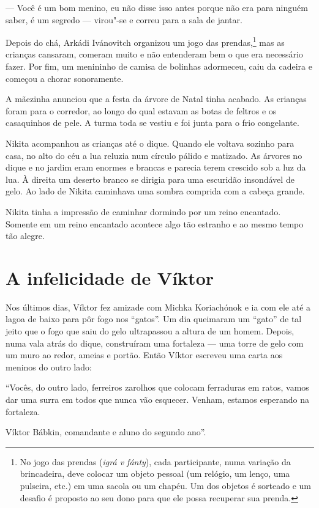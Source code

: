 --- Você é um bom menino, eu não disse isso antes porque não era para
ninguém saber, é um segredo --- virou"-se e correu para a sala de jantar.

Depois do chá, Arkádi Ivánovitch organizou um jogo das
prendas,\footnote{No jogo das prendas (\emph{igrá v fánty}), cada
  participante, numa variação da brincadeira, deve colocar um objeto
  pessoal (um relógio, um lenço, uma pulseira, etc.) em uma sacola ou um
  chapéu. Um dos objetos é sorteado e um desafio é proposto ao seu dono
  para que ele possa recuperar sua prenda.} mas as crianças cansaram,
comeram muito e não entenderam bem o que era necessário fazer. Por fim,
um menininho de camisa de bolinhas adormeceu, caiu da cadeira e começou
a chorar sonoramente.

A mãezinha anunciou que a festa da árvore de Natal tinha acabado. As
crianças foram para o corredor, ao longo do qual estavam as botas de
feltros e os casaquinhos de pele. A turma toda se vestiu e foi junta
para o frio congelante.

Nikita acompanhou as crianças até o dique. Quando ele voltava sozinho
para casa, no alto do céu a lua reluzia num círculo pálido e matizado.
As árvores no dique e no jardim eram enormes e brancas e parecia terem
crescido sob a luz da lua. À direita um deserto branco se dirigia para
uma escuridão insondável de gelo. Ao lado de Nikita caminhava uma sombra
comprida com a cabeça grande.

Nikita tinha a impressão de caminhar dormindo por um reino encantado.
Somente em um reino encantado acontece algo tão estranho e ao mesmo
tempo tão alegre.

\chapter{A infelicidade de Víktor}

Nos últimos dias, Víktor fez amizade com Michka Koriachónok e ia com ele
até a lagoa de baixo para pôr fogo nos ``gatos''. Um dia queimaram um
``gato'' de tal jeito que o fogo que saiu do gelo ultrapassou a altura
de um homem. Depois, numa vala atrás do dique, construíram uma fortaleza
--- uma torre de gelo com um muro ao redor, ameias e portão. Então
Víktor escreveu uma carta aos meninos do outro lado:

``Vocês, do outro lado, ferreiros zarolhos que colocam ferraduras em
ratos, vamos dar uma surra em todos que nunca vão esquecer. Venham,
estamos esperando na fortaleza.

Víktor Bábkin, comandante e aluno do segundo ano''.

